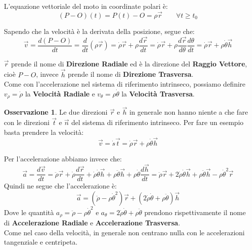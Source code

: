\documentclass[11pt,a4paper,twoside]{article}
\theoremstyle{definition}
\newtheorem*{oss}{Osservazione}
\begin{document}
L'equazione vettoriale del moto in coordinate polari è:
\[ (P-O)(t) = P(t)- O = \rho \vec r\qquad \forall t \geq t_0 \]

Sapendo che la velocità è la derivata della posizione, segue che:
\[\vec v = \frac{d(P-O)}{dt} = \frac d{dt}(\rho \vec r) = \dot \rho \vec r + \rho \frac{d \vec r}{dt} = \dot \rho \vec r + \rho \frac{d \vec r}{d \theta} \frac {d \theta}{dt} = \dot \rho \vec r + \rho \dot \theta \vec h\]

$\vec r$ prende il nome di \textbf{Direzione Radiale} ed è la direzione del \textbf{Raggio Vettore}, cioè $P-O$, invece $\vec h$ prende il nome di \textbf{Direzione Trasversa}.\\
Come con l'accelerazione nel sistema di riferimento intrinseco, possiamo definire $v_\rho = \dot \rho$ la \textbf{Velocità Radiale} e $v _\theta = \rho \dot \theta$ la \textbf{Velocità Trasversa}.

\begin{oss}
	Le due direzioni $\vec r$ e $\vec h$ in generale non hanno niente a che fare con le direzioni $\vec t$ e $\vec n$ del sistema di riferimento intrinseco. Per fare un esempio basta prendere la velocità:
	\[ \vec v = \dot s \vec t = \dot \rho \vec r + \rho \dot \theta \vec h \]
\end{oss}

\begin{center}
\end{center}

Per l'accelerazione abbiamo invece che:
\[\vec a = \frac{d \vec v}{dt} = \ddot \rho \vec r + \dot \rho \frac{d \vec r}{dt} + \dot \rho \dot \theta \vec h + \rho \ddot \theta \vec h + \rho \dot \theta \frac{d \vec h}{dt} = \ddot \rho \vec r + 2 \dot \rho \dot \theta \vec h + \rho \ddot \theta \vec h - \rho \dot \theta^2 \vec r\]
Quindi ne segue che l'accelerazione è:
\[\vec a = (\ddot \rho - \rho  \dot \theta^2)\vec r + (2 \dot \rho \dot \theta + \rho \ddot \theta) \vec h\]
Dove le quantità $a_\rho = \ddot \rho - \rho \dot \theta^2$ e $a_\theta = 2 \dot \rho \dot \theta + \rho \ddot \theta$ prendono rispettivamente il nome di \textbf{Accelerazione Radiale} e \textbf{Accelerazione Trasversa}.\\
Come nel caso della velocità, in generale non centrano nulla con le accelerazioni tangenziale e centripeta.
\end{document}
